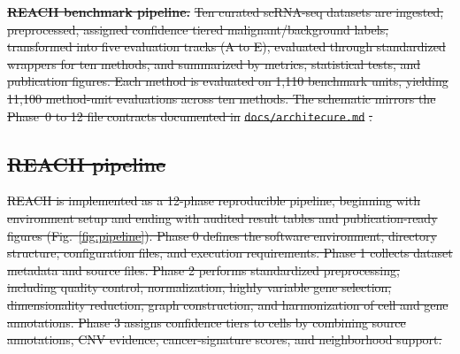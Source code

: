 \documentclass[10pt]{article}
\providecommand{\DIFdeltex}[1]{{\protect\color{red}\sout{#1}}}                      %
\providecommand{\DIFdelFL}[1]{\DIFdel{#1}} %
\providecommand{\DIFdel}[1]{\texorpdfstring{\DIFdeltex{#1}}{}} %
\begin{document}
\begin{enumerate}
{%
\textbf{\DIFdelFL{REACH benchmark pipeline.}} %
\DIFdelFL{Ten curated scRNA-seq
datasets are ingested, preprocessed, assigned confidence tiered
malignant/background labels, transformed into five evaluation tracks
(A to E), evaluated through standardized wrappers for ten methods, and
summarized by metrics, statistical tests, and publication figures. Each method is evaluated on 1,110 benchmark units, yielding 11,100 method-unit evaluations across ten methods. The
schematic mirrors the Phase~0 to 12 file contracts documented in
}\texttt{\DIFdelFL{docs/architecure.md}}%
\DIFdelFL{.}}

\subsection{\DIFdel{REACH pipeline}}
\addtocounter{subsection}{-1}%

\DIFdel{REACH is implemented as a 12-phase reproducible pipeline, beginning with environment setup and ending with audited result tables and publication-ready figures (Fig.~\ref{fig:pipeline}). Phase 0 defines the software environment, directory structure, configuration files, and execution requirements. Phase 1 collects dataset metadata and source files. Phase 2 performs standardized preprocessing, including quality control, normalization, highly variable gene selection, dimensionality reduction, graph construction, and harmonization of cell and gene annotations. Phase 3 assigns confidence tiers to cells by combining source annotations, CNV evidence, cancer-signature scores, and neighborhood support.
}%


\end{enumerate}
\end{document}
